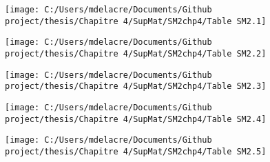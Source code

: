 \documentclass[
  english,
  man,mask,floatsintext]{apa6}
\begin{document}
\begin{landscape}
\newpage

\begin{figure}

{\centering \texttt{[image: C:/Users/mdelacre/Documents/Github project/thesis/Chapitre 4/SupMat/SM2chp4/Table SM2.1]} 

}

\end{figure}

\end{landscape}
\begin{landscape}
\newpage

\begin{figure}

{\centering \texttt{[image: C:/Users/mdelacre/Documents/Github project/thesis/Chapitre 4/SupMat/SM2chp4/Table SM2.2]} 

}

\end{figure}

\end{landscape}
\begin{landscape}
\newpage

\begin{figure}

{\centering \texttt{[image: C:/Users/mdelacre/Documents/Github project/thesis/Chapitre 4/SupMat/SM2chp4/Table SM2.3]} 

}

\end{figure}

\end{landscape}
\begin{landscape}
\newpage

\begin{figure}

{\centering \texttt{[image: C:/Users/mdelacre/Documents/Github project/thesis/Chapitre 4/SupMat/SM2chp4/Table SM2.4]} 

}

\end{figure}

\end{landscape}
\begin{landscape}
\newpage

\begin{figure}

{\centering \texttt{[image: C:/Users/mdelacre/Documents/Github project/thesis/Chapitre 4/SupMat/SM2chp4/Table SM2.5]} 

}

\end{figure}

\end{landscape}
\end{document}
